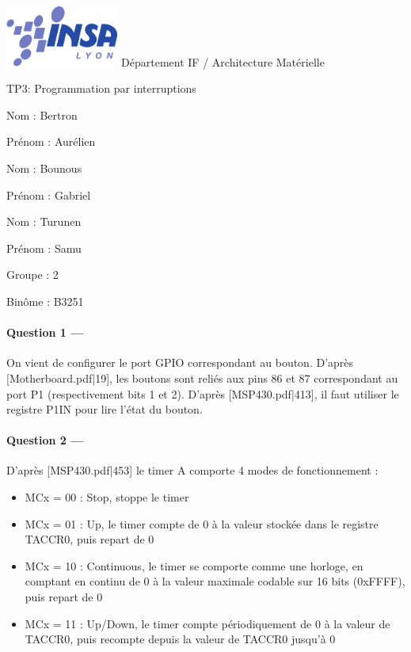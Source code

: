 \documentclass[a4paper,11pt,article]{memoir}
\renewcommand\title[1]{{\LARGE\fontfamily{pag}\selectfont #1}\par\bigskip}
\begin{document}
\includegraphics[height=2cm]{fig/insa.pdf}
%
\hfill
%
{\selectfont Département IF / Architecture Matérielle}

\bigskip

\title{TP3: Programmation par interruptions}

\bigskip
\noindent\par\parbox{.48\textwidth}{Nom : Bertron} \parbox{.48\textwidth}{Prénom : Aurélien}
\bigskip
\noindent\par\parbox{.48\textwidth}{Nom : Bounous} \parbox{.48\textwidth}{Prénom : Gabriel}
\bigskip
\noindent\par\parbox{.48\textwidth}{Nom : Turunen} \parbox{.48\textwidth}{Prénom : Samu}
\bigskip
\noindent\par\parbox{.2\textwidth}{Groupe : 2} \parbox{.2\textwidth}{Binôme : B3251}

\bigskip

\paragraph{Question 1 ---}  On vient de configurer le port GPIO correspondant au bouton. D'après [Motherboard.pdf|19], les boutons sont reliés aux pins 86 et 87 correspondant au port P1 (respectivement bits 1 et 2). D'après [MSP430.pdf|413], il faut utiliser le registre P1IN pour lire l'état du bouton.

\paragraph{Question 2 ---} D'après [MSP430.pdf|453] le timer A comporte 4 modes de fonctionnement :\\
\begin{itemize}
	\item MCx = 00 : Stop, stoppe le timer
	\item MCx = 01 : Up, le timer compte de 0 à la valeur stockée dans le registre TACCR0, puis repart de 0
	\item MCx = 10 : Continuous, le timer se comporte comme une horloge, en comptant en continu de 0 à la valeur maximale codable sur 16 bits (0xFFFF), puis repart de 0
	\item MCx = 11 : Up/Down, le timer compte périodiquement de 0 à la valeur de TACCR0, puis recompte depuis la valeur de TACCR0 jusqu'à 0
\end{itemize}
\end{document}
